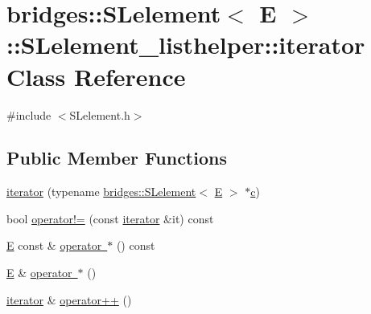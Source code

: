 \hypertarget{classbridges_1_1_s_lelement_1_1_s_lelement__listhelper_1_1iterator}{}\section{bridges\+::S\+Lelement$<$ E $>$\+::S\+Lelement\+\_\+listhelper\+::iterator Class Reference}
\label{classbridges_1_1_s_lelement_1_1_s_lelement__listhelper_1_1iterator}


{\ttfamily \#include $<$S\+Lelement.\+h$>$}

\subsection*{Public Member Functions}
\begin{DoxyCompactItemize}
\item 
\mbox{\hyperlink{classbridges_1_1_s_lelement_1_1_s_lelement__listhelper_1_1iterator_a7699b38922ea4088820413ee5ad0b165}{iterator}} (typename \mbox{\hyperlink{classbridges_1_1_s_lelement}{bridges\+::\+S\+Lelement}}$<$ \mbox{\hyperlink{namespacebridges_acfb0a4f7877d8f63de3e6862004c50eda3a3ea00cfc35332cedf6e5e9a32e94da}{E}} $>$ $\ast$\mbox{\hyperlink{namespacebridges_acfb0a4f7877d8f63de3e6862004c50eda4a8a08f09d37b73795649038408b5f33}{c}})
\item 
bool \mbox{\hyperlink{classbridges_1_1_s_lelement_1_1_s_lelement__listhelper_1_1iterator_ac39a33029eb4ebbed3d0992a9fda1c9a}{operator!=}} (const \mbox{\hyperlink{classbridges_1_1_s_lelement_1_1_s_lelement__listhelper_1_1iterator}{iterator}} \&it) const
\item 
\mbox{\hyperlink{namespacebridges_acfb0a4f7877d8f63de3e6862004c50eda3a3ea00cfc35332cedf6e5e9a32e94da}{E}} const  \& \mbox{\hyperlink{classbridges_1_1_s_lelement_1_1_s_lelement__listhelper_1_1iterator_aa425003a895671e7fd953f139d276297}{operator $\ast$}} () const
\item 
\mbox{\hyperlink{namespacebridges_acfb0a4f7877d8f63de3e6862004c50eda3a3ea00cfc35332cedf6e5e9a32e94da}{E}} \& \mbox{\hyperlink{classbridges_1_1_s_lelement_1_1_s_lelement__listhelper_1_1iterator_ae679bf8be1198cfa66452939812f12ca}{operator $\ast$}} ()
\item 
\mbox{\hyperlink{classbridges_1_1_s_lelement_1_1_s_lelement__listhelper_1_1iterator}{iterator}} \& \mbox{\hyperlink{classbridges_1_1_s_lelement_1_1_s_lelement__listhelper_1_1iterator_acc2e5d9cba1b837897c0ff8d42618d3a}{operator++}} ()
\end{DoxyCompactItemize}


